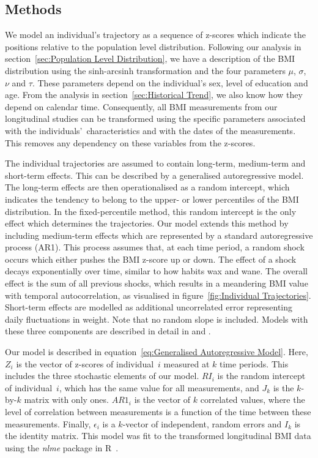 \documentclass{imammb}
\numberwithin{equation}{section}
\begin{document}
\subsection{Methods}
\label{sec:Individual Trajectories/Methods}

We model an individual's trajectory as a sequence of z-scores which indicate the positions relative to the population level distribution. Following our analysis in section~\ref{sec:Population Level Distribution}, we have a description of the BMI distribution using the sinh-arcsinh transformation and the four parameters $\mu$, $\sigma$, $\nu$ and $\tau$. These \mbox{parameters} depend on the individual's sex, level of education and age. From the analysis in section~\ref{sec:Historical Trend}, we also know how they depend on calendar time. Consequently, all BMI measurements from our longitudinal studies can be transformed using the specific parameters associated with the individuals'~characteristics and with the dates of the measurements. This removes any dependency on these variables from the z-scores.

The individual trajectories are assumed to contain long-term, medium-term and short-term effects. This can be described by a generalised autoregressive model. The long-term effects are then operationalised as a random intercept, which indicates the tendency to belong to the upper- or lower percentiles of the BMI distribution. In the fixed-percentile method, this random intercept is the only effect which determines the trajectories. Our model extends this method by including medium-term effects which are represented by a standard autoregressive process (AR1). This process assumes that, at each time period, a random shock occurs which either pushes the BMI z-score up or down. The effect of a shock decays exponentially over time, similar to how habits wax and wane. The overall effect is the sum of all previous shocks, which results in a meandering BMI value with temporal autocorrelation, as visualised in figure~\ref{fig:Individual Trajectories}. Short-term effects are modelled as additional uncorrelated error representing daily fluctuations in weight. Note that no random slope is included. Models with these three components are described in detail in \cite{Diggle1988, Diggle1994} and \cite{Verbeke2000}.

Our model is described in equation~\ref{eq:Generalised Autoregressive Model}. Here, $Z_{i}$ is the vector of z-scores of individual~$i$ measured at $k$ time periods. This includes the three stochastic elements of our model. $RI_i$ is the random intercept of individual~$i$, which has the same value for all measurements, and $J_k$ is the $k$-by-$k$ matrix with only ones. $AR1_i$ is the vector of $k$ correlated values, where the level of correlation between measurements is a function of the time between these measurements. Finally, $\epsilon_{i}$ is a $k$-vector of independent, random errors and $I_k$ is the identity matrix. This model was fit to the transformed longitudinal BMI data using the \textit{nlme} package in R~\citep{nlme2021, R2021}.
\end{document}
